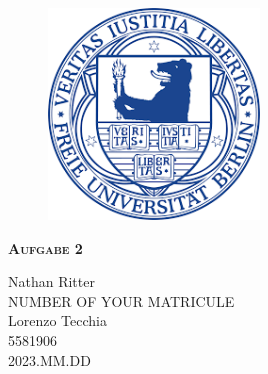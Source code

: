 \documentclass{report}
\begin{document}
\begin{center}
	
\end{center}
    \begin{figure}[htbp!]
        \begin{center}
            \includegraphics[width=0.5\textwidth]{Immagini/FUlogo.png}
        \end{center}
    \end{figure}
    
    {\centering\scshape\Large\bfseries Aufgabe 2
    \begin{center}
        Nathan Ritter  \\ NUMBER OF YOUR MATRICULE \\
        Lorenzo Tecchia \\ 5581906  \\ 2023.MM.DD
    \end{center}}


    \newpage
    
    \tableofcontents
    
    
    
    
\end{document}
